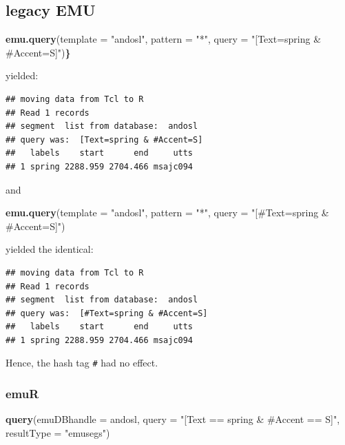 \documentclass[]{book}
\newenvironment{Shaded}{\begin{snugshade}}{\end{snugshade}}
\newcommand{\DataTypeTok}[1]{\textcolor[rgb]{0.13,0.29,0.53}{#1}}
\newcommand{\ErrorTok}[1]{\textcolor[rgb]{0.64,0.00,0.00}{\textbf{#1}}}
\newcommand{\KeywordTok}[1]{\textcolor[rgb]{0.13,0.29,0.53}{\textbf{#1}}}
\newcommand{\NormalTok}[1]{#1}
\newcommand{\StringTok}[1]{\textcolor[rgb]{0.31,0.60,0.02}{#1}}
\begin{document}
\hypertarget{legacy-emu}{%
\subsection{legacy EMU}\label{legacy-emu}}

\begin{Shaded}
\begin{Highlighting}[]
\KeywordTok{emu.query}\NormalTok{(}\DataTypeTok{template =} \StringTok{"andosl"}\NormalTok{, }
          \DataTypeTok{pattern =} \StringTok{"*"}\NormalTok{,}
          \DataTypeTok{query =} \StringTok{"[Text=spring & #Accent=S]"}\NormalTok{)}\ErrorTok{\}}
\end{Highlighting}
\end{Shaded}

yielded:

\begin{verbatim}
## moving data from Tcl to R
## Read 1 records
## segment  list from database:  andosl
## query was:  [Text=spring & #Accent=S]
##   labels    start      end     utts
## 1 spring 2288.959 2704.466 msajc094
\end{verbatim}

and

\begin{Shaded}
\begin{Highlighting}[]
\KeywordTok{emu.query}\NormalTok{(}\DataTypeTok{template =} \StringTok{"andosl"}\NormalTok{,}
          \DataTypeTok{pattern =} \StringTok{"*"}\NormalTok{,}
          \DataTypeTok{query =} \StringTok{"[#Text=spring & #Accent=S]"}\NormalTok{)}
\end{Highlighting}
\end{Shaded}

yielded the identical:

\begin{verbatim}
## moving data from Tcl to R
## Read 1 records
## segment  list from database:  andosl
## query was:  [#Text=spring & #Accent=S]
##   labels    start      end     utts
## 1 spring 2288.959 2704.466 msajc094
\end{verbatim}

Hence, the hash tag \texttt{\#} had no effect.

\hypertarget{emur}{%
\subsubsection{emuR}\label{emur}}

\begin{Shaded}
\begin{Highlighting}[]
\KeywordTok{query}\NormalTok{(}\DataTypeTok{emuDBhandle =}\NormalTok{ andosl,}
      \DataTypeTok{query =} \StringTok{"[Text == spring & #Accent == S]"}\NormalTok{,}
      \DataTypeTok{resultType =} \StringTok{"emusegs"}\NormalTok{)}
\end{Highlighting}
\end{Shaded}
\end{document}
